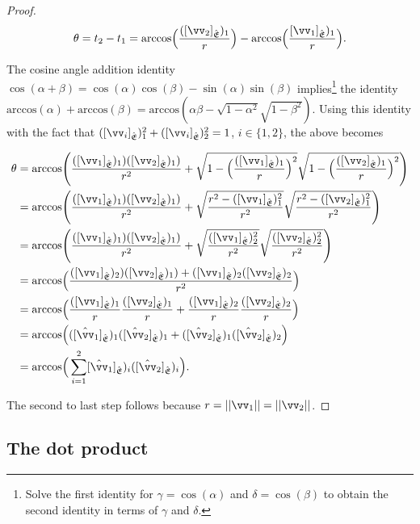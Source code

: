 \begin{proof}
   \begin{align*}
       \theta = t_2 - t_1 
       = \text{arccos}\Big(\frac{([\vv_2]_\sE)_1}{r}\Big) - \text{arccos}\Big(\frac{[\vv_1]_\sE)_1}{r}\Big).
   \end{align*}
   
   The cosine angle addition identity $\cos(\alpha + \beta) = \cos(\alpha) \cos(\beta) - \sin(\alpha) \sin(\beta)$ implies\footnote{Solve the first identity for $\gamma = \cos(\alpha)$ and $\delta = \cos(\beta)$ to obtain the second identity in terms of $\gamma$ and $\delta$.} the identity $\text{arccos}(\alpha) + \text{arccos}(\beta) = \text{arccos}(\alpha \beta - \sqrt{1 - \alpha^2}\sqrt{1 - \beta^2})$. Using this identity with the fact that ${([\vv_i]_\sE)_1^2 + ([\vv_i]_\sE)_2^2 = 1}$, $i \in \{1, 2\}$, the above becomes
   
   \begin{align*}
       \theta &= \text{arccos}\Bigg(\frac{([\vv_1]_\sE)_1) ([\vv_2]_\sE)_1)}{r^2} + \sqrt{1 - \Big(\frac{([\vv_1]_\sE)_1}{r}\Big)^2} \sqrt{1 - \Big(\frac{([\vv_2]_\sE)_1}{r}\Big)^2} \Bigg) \\
       &= \text{arccos}\Bigg(\frac{([\vv_1]_\sE)_1) ([\vv_2]_\sE)_1)}{r^2} + \sqrt{\frac{r^2 - ([\vv_1]_\sE)_1^2}{r^2}} \sqrt{\frac{r^2 - ([\vv_2]_\sE)_1^2}{r^2}} \Bigg) \\
       &= \text{arccos}\Bigg(\frac{([\vv_1]_\sE)_1) ([\vv_2]_\sE)_1)}{r^2} + \sqrt{\frac{([\vv_1]_\sE)_2^2}{r^2}} \sqrt{\frac{([\vv_2]_\sE)_2^2}{r^2}} \Bigg) \\
       &= \text{arccos}\Big(\frac{([\vv_1]_\sE)_2) ([\vv_2]_\sE)_1) + ([\vv_1]_\sE)_2 ([\vv_2]_\sE)_2}{r^2}\Big) \\
       &= \text{arccos}\Big( \frac{([\vv_1]_\sE)_1}{r} \frac{([\vv_2]_\sE)_1}{r} + \frac{([\vv_1]_\sE)_2}{r} \frac{([\vv_2]_\sE)_2}{r} \Big) \\
       &= \text{arccos}\Big(([\hat{\vv}_1]_\sE)_1  ([\hat{\vv}_2]_\sE)_1 + ([\hat{\vv}_2]_\sE)_1 ([\hat{\vv}_2]_\sE)_2\Big) \\
       &= \text{arccos}\Big( \sum_{i = 1}^2 [\hat{\vv}_1]_\sE)_i ([\hat{\vv}_2]_\sE)_i \Big).
   \end{align*}
   
   The second to last step follows because $r = ||\vv_1|| = ||\vv_2||$.
\end{proof}

\newpage

\subsection*{The dot product}
\label{ch::lin_alg::section::dot_product}

